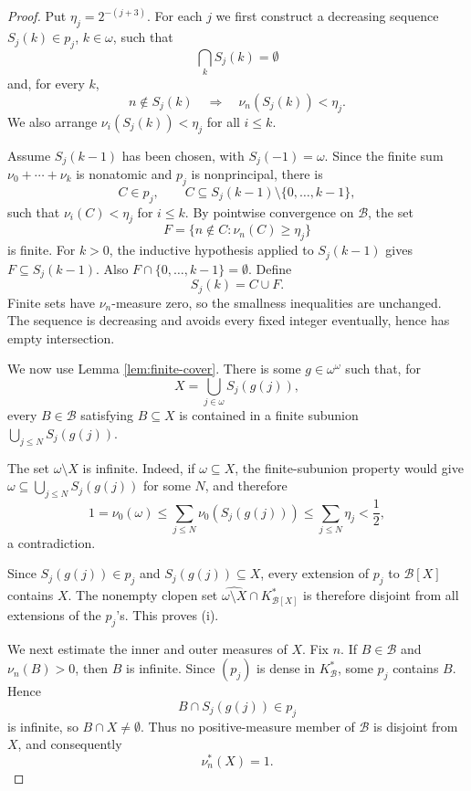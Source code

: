 \documentclass[11pt]{amsart}
\theoremstyle{definition}
\begin{document}
\begin{proof}
Put \(\eta_j=2^{-(j+3)}\).  For each \(j\) we first construct a decreasing
sequence \(S_j(k)\in p_j\), \(k\in\omega\), such that
\[
        \bigcap_k S_j(k)=\emptyset
\]
and, for every \(k\),
\[
        n\notin S_j(k)\quad\Longrightarrow\quad
        \nu_n(S_j(k))<\eta_j.               \tag{1}
\]
We also arrange \(\nu_i(S_j(k))<\eta_j\) for all \(i\le k\).

Assume \(S_j(k-1)\) has been chosen, with \(S_j(-1)=\omega\).  Since the finite
sum \(\nu_0+\cdots+\nu_k\) is nonatomic and \(p_j\) is nonprincipal, there is
\[
        C\in p_j,\qquad
        C\subseteq S_j(k-1)\setminus\{0,\ldots,k-1\},
\]
such that \(\nu_i(C)<\eta_j\) for \(i\le k\).  By pointwise convergence on
\(\mathcal B\), the set
\[
        F=\{n\notin C:\nu_n(C)\ge\eta_j\}
\]
is finite.  For \(k>0\), the inductive hypothesis applied to \(S_j(k-1)\) gives
\(F\subseteq S_j(k-1)\).  Also \(F\cap\{0,\ldots,k-1\}=\emptyset\).  Define
\[
        S_j(k)=C\cup F.
\]
Finite sets have \(\nu_n\)-measure zero, so the smallness inequalities are
unchanged.  The sequence is decreasing and avoids every fixed integer
eventually, hence has empty intersection.

We now use Lemma \ref{lem:finite-cover}.  There is some \(g\in\omega^\omega\)
such that, for
\[
        X=\bigcup_{j\in\omega} S_j(g(j)),
\]
every \(B\in\mathcal B\) satisfying \(B\subseteq X\) is contained in a finite
subunion \(\bigcup_{j\le N}S_j(g(j))\).

The set \(\omega\setminus X\) is infinite.  Indeed, if \(\omega\subseteq X\),
the finite-subunion property would give
\(\omega\subseteq\bigcup_{j\le N}S_j(g(j))\) for some \(N\), and therefore
\[
        1=\nu_0(\omega)
        \le \sum_{j\le N}\nu_0(S_j(g(j)))
        \le \sum_{j\le N}\eta_j < \frac12,
\]
a contradiction.

Since \(S_j(g(j))\in p_j\) and \(S_j(g(j))\subseteq X\), every extension of
\(p_j\) to \(\mathcal B[X]\) contains \(X\).  The nonempty clopen set
\(\widehat{\omega\setminus X}\cap K_{\mathcal B[X]}^*\) is therefore disjoint
from all extensions of the \(p_j\)'s.  This proves (i).

We next estimate the inner and outer measures of \(X\).  Fix \(n\).  If
\(B\in\mathcal B\) and \(\nu_n(B)>0\), then \(B\) is infinite.  Since
\((p_j)\) is dense in \(K_\mathcal B^*\), some \(p_j\) contains \(B\).  Hence
\[
        B\cap S_j(g(j))\in p_j
\]
is infinite, so \(B\cap X\ne\emptyset\).  Thus no positive-measure member of
\(\mathcal B\) is disjoint from \(X\), and consequently
\[
        \nu_n^*(X)=1.                       \tag{2}
\]


\end{proof}
\end{document}
